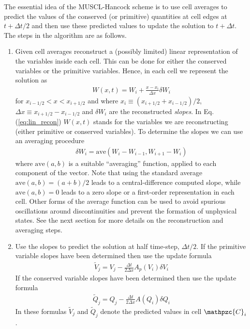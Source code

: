 \documentclass[11pt, reqno]{amsart}
\newcommand{\eqr}[1]{Eq.\thinspace(#1)}
\newcommand{\script}[1]{\mathpzc{#1}}
\theoremstyle{definition}
\begin{document}
The essential idea of the MUSCL-Hancock scheme is to use cell averages
to predict the values of the conserved (or primitive) quantities at
cell edges at $t+\Delta t/2$ and then use these predicted values to
update the solution to $t+\Delta t$. The steps in the algorithm are as
follows.
\begin{enumerate}

\item Given cell averages reconstruct a (possibly limited) linear
  representation of the variables inside each cell. This can be done
  for either the conserved variables or the primitive
  variables. Hence, in each cell we represent the solution as
  \begin{align}
    W(x,t) = W_i + \frac{x-x_i}{\Delta x}\delta W_i \label{eq:lin_recon}
  \end{align}
  for $x_{i-1/2}<x<x_{i+1/2}$ and where $x_i \equiv
  (x_{i+1/2}+x_{i-1/2})/2$, $\Delta x \equiv x_{i+1/2}-x_{i-1/2}$ and
  $\delta W_i$ are the reconstructed \emph{slopes}. In
  \eqr{\ref{eq:lin_recon}} $W(x,t)$ stands for the variables we are
  reconstructing (either primitive or conserved variables). To
  determine the slopes we can use an averaging procedure
  \begin{align}
    \delta W_i = \mathrm{ave}(W_i-W_{i-1}, W_{i+1}-W_i) \label{eqn:slope_recon}
  \end{align}
  where $\mathrm{ave}(a, b)$ is a suitable ``averaging'' function,
  applied to each component of the vector. Note that using the
  standard average $\mathrm{ave}(a, b) = (a+b)/2$ leads to a
  central-difference computed slope, while $\mathrm{ave}(a, b) = 0$
  leads to a zero slope or a first-order representation in each
  cell. Other forms of the average function can be used to avoid
  spurious oscillations around discontinuities and prevent the
  formation of unphysical states. See the next section for more
  details on the reconstruction and averaging steps.
  
\item Use the slopes to predict the solution at half time-step,
  $\Delta t/2$. If the primitive variable slopes have been determined
  then use the update formula
  \begin{align}
    \tilde{V}_j = V_j -\frac{\Delta t}{2 \Delta x} A_p(V_i) \delta V_i
  \end{align}
  If the conserved variable slopes have been determined then use the
  update formula
  \begin{align}
    \tilde{Q}_j = Q_j -\frac{\Delta t}{2 \Delta x} A(Q_i) \delta Q_i
  \end{align}
  In these formulas $\tilde{V}_j$ and $\tilde{Q}_j$ denote the
  predicted values in cell $\script{C}_i$.


\end{enumerate}
\end{document}
